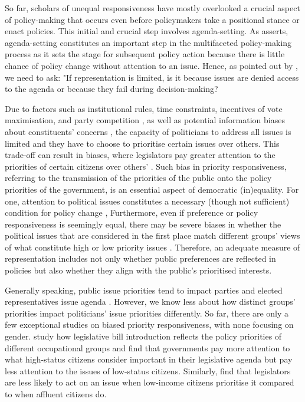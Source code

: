 So far, scholars of unequal responsiveness have mostly overlooked a crucial aspect of policy-making that occurs even before policymakers take a positional stance or enact policies. This initial and crucial step involves agenda-setting. As \textcite{jones_representation_2004} asserts, agenda-setting constitutes an important step in the multifaceted policy-making process as it sets the stage for subsequent policy action because there is little chance of policy change without attention to an issue. Hence, as pointed out by \parencite[278]{jones_representation_2009}, we need to ask: "If representation is limited, is it because issues are denied access to the agenda or because they fail during decision-making?

Due to factors such as institutional rules, time constraints, incentives of vote maximisation, and party competition \parencite{hobolt_government_2008, abou-chadi_brahmin_2021, slapin_introduction_2014}, as well as potential information biases about constituents' concerns \parencite{traber_social_2022}, the capacity of politicians to address all issues is limited and they have to choose to prioritise certain issues over others. This trade-off can result in biases, where legislators pay greater attention to the priorities of certain citizens over others' \parencite{jones_agenda_2018}. Such bias in priority responsiveness, referring to the transmission of the priorities of the public onto the policy priorities of the government, is an essential aspect of democratic (in)equality. For one, attention to political issues constitutes a necessary (though not sufficient) condition for policy change \parencite{jones_representation_2004}, Furthermore, even if preference or policy responsiveness is seemingly equal, there may be severe biases in whether the political issues that are considered in the first place match different groups' views of what constitute high or low priority issues \parencite[2]{jones_representation_2004}. Therefore, an adequate measure of representation includes not only whether public preferences are reflected in policies but also whether they align with the public's prioritised interests.

Generally speaking, public issue priorities tend to impact parties and elected representatives issue agenda \parencite{dennison_explaining_2023, reher_role_2014, kluver_setting_2016,kluver_who_2016, barbera_who_2019}.
However, we know less about how distinct groups' priorities impact politicians' issue priorities differently. So far, there are only a few exceptional studies on biased priority responsiveness, with none focusing on gender. \textcite{traber_social_2022} study how legislative bill introduction reflects the policy priorities of different occupational groups and find that governments pay more attention to what high-status citizens consider important in their legislative agenda but pay less attention to the issues of low-status citizens. Similarly, \textcite{flavin_governments_2017} find that legislators are less likely to act on an issue when low-income citizens prioritise it compared to when affluent citizens do. 

